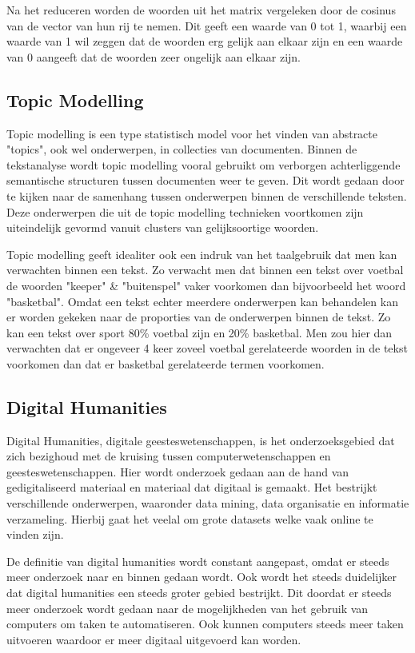 Na het reduceren worden de woorden uit het matrix vergeleken door de cosinus van de vector van hun rij te nemen. Dit geeft een waarde van 0 tot 1, waarbij een waarde van 1 wil zeggen dat de woorden erg gelijk aan elkaar zijn en een waarde van 0 aangeeft dat de woorden zeer ongelijk aan elkaar zijn. \citep{dumais2004latent}

\subsection{Topic Modelling}
Topic modelling is een type statistisch model voor het vinden van abstracte "topics", ook wel onderwerpen, in collecties van documenten. Binnen de tekstanalyse wordt topic modelling vooral gebruikt om verborgen achterliggende semantische structuren tussen documenten weer te geven. Dit wordt gedaan door te kijken naar de samenhang tussen onderwerpen binnen de verschillende teksten. Deze onderwerpen die uit de topic modelling technieken voortkomen zijn uiteindelijk gevormd vanuit clusters van gelijksoortige woorden.

Topic modelling geeft idealiter ook een indruk van het taalgebruik dat men kan verwachten binnen een tekst. Zo verwacht men dat binnen een tekst over voetbal de woorden "keeper" \& "buitenspel" vaker voorkomen dan bijvoorbeeld het woord "basketbal". Omdat een tekst echter meerdere onderwerpen kan behandelen kan er worden gekeken naar de proporties van de onderwerpen binnen de tekst. Zo kan een tekst over sport 80\% voetbal zijn en 20\% basketbal. Men zou hier dan verwachten dat er ongeveer 4 keer zoveel voetbal gerelateerde woorden in de tekst voorkomen dan dat er basketbal gerelateerde termen voorkomen. \citep{sojka2010software}

\subsection{Digital Humanities}
Digital Humanities, digitale geesteswetenschappen, is het onderzoeksgebied dat zich bezighoud met de kruising tussen computerwetenschappen en geesteswetenschappen. Hier wordt onderzoek gedaan aan de hand van gedigitaliseerd materiaal en materiaal dat digitaal is gemaakt. Het bestrijkt verschillende onderwerpen, waaronder data mining, data organisatie en informatie verzameling. Hierbij gaat het veelal om grote datasets welke vaak online te vinden zijn. 

De definitie van digital humanities wordt constant aangepast, omdat er steeds meer onderzoek naar en binnen gedaan wordt. Ook wordt het steeds duidelijker dat digital humanities een steeds groter gebied bestrijkt. Dit doordat er steeds meer onderzoek wordt gedaan naar de mogelijkheden van het gebruik van computers om taken te automatiseren. Ook kunnen computers steeds meer taken uitvoeren waardoor er meer digitaal uitgevoerd kan worden.\citep{berry2012understanding}

